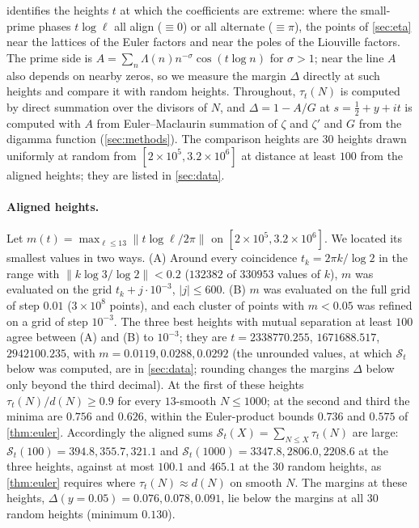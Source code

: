 \documentclass[11pt]{article}
\theoremstyle{definition}\newtheorem{definition}[theorem]{Definition}
\theoremstyle{remark}\newtheorem{remark}[theorem]{Remark}
\begin{document}
 identifies the heights $t$ at which the coefficients are extreme: where the small-prime phases $t\log\ell$ all align ($\equiv0$) or all alternate ($\equiv\pi$), the points of \cref{sec:eta} near the lattices of the Euler factors and near the poles of the Liouville factors. The prime side is $A=\sum_n\Lambda(n)n^{-\sigma}\cos(t\log n)$ for $\sigma>1$; near the line $A$ also depends on nearby zeros, so we measure the margin $\Delta$ directly at such heights and compare it with random heights. Throughout, $\tau_t(N)$ is computed by direct summation over the divisors of $N$, and $\Delta=1-A/G$ at $s=\frac12+y+it$ is computed with $A$ from Euler--Maclaurin summation of $\zeta$ and $\zeta'$ and $G$ from the digamma function (\cref{sec:methods}). The comparison heights are $30$ heights drawn uniformly at random from $[2\times10^5,3.2\times10^6]$ at distance at least $100$ from the aligned heights; they are listed in \cref{sec:data}.

\paragraph{Aligned heights.} Let $m(t)=\max_{\ell\le13}\|t\log\ell/2\pi\|$ on $[2\times10^5,3.2\times10^6]$. We located its smallest values in two ways. (A) Around every coincidence $t_k=2\pi k/\log2$ in the range with $\|k\log3/\log2\|<0.2$ ($132382$ of $330953$ values of $k$), $m$ was evaluated on the grid $t_k+j\cdot10^{-3}$, $|j|\le600$. (B) $m$ was evaluated on the full grid of step $0.01$ ($3\times10^8$ points), and each cluster of points with $m<0.05$ was refined on a grid of step $10^{-3}$. The three best heights with mutual separation at least $100$ agree between (A) and (B) to $10^{-3}$; they are $t=2338770.255$, $1671688.517$, $2942100.235$, with $m=0.0119,0.0288,0.0292$ (the unrounded values, at which $\mathcal S_t$ below was computed, are in \cref{sec:data}; rounding changes the margins $\Delta$ below only beyond the third decimal). At the first of these heights $\tau_t(N)/d(N)\ge0.9$ for every $13$-smooth $N\le1000$; at the second and third the minima are $0.756$ and $0.626$, within the Euler-product bounds $0.736$ and $0.575$ of \cref{thm:euler}. Accordingly the aligned sums $\mathcal S_t(X)=\sum_{N\le X}\tau_t(N)$ are large: $\mathcal S_t(100)=394.8,355.7,321.1$ and $\mathcal S_t(1000)=3347.8,2806.0,2208.6$ at the three heights, against at most $100.1$ and $465.1$ at the $30$ random heights, as \cref{thm:euler} requires where $\tau_t(N)\approx d(N)$ on smooth $N$. The margins at these heights, $\Delta(y{=}0.05)=0.076,0.078,0.091$, lie below the margins at all $30$ random heights (minimum $0.130$).
\end{document}
